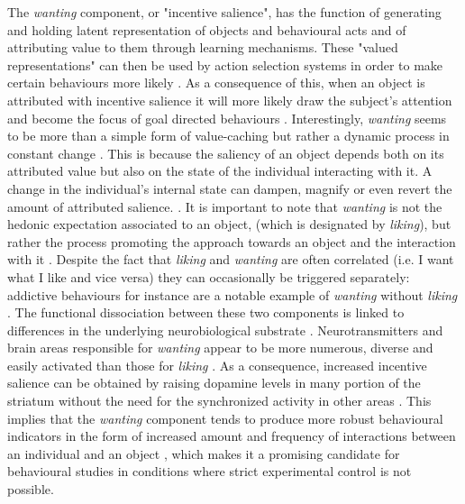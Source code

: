 The \emph{wanting} component, or "incentive salience", has the function of generating and holding latent representation of objects and behavioural acts and of attributing value to them through learning mechanisms. These "valued representations" can then be used by action selection systems in order to make certain behaviours more likely \cite{ikemoto1996dissociations,berridge1998role,mcclure2003computational,berridge2004motivation}. As a consequence of this, when an object is attributed with incentive salience it will more likely draw the subject's attention and become the focus of goal directed behaviours \cite{berridge2004motivation}. Interestingly, \emph{wanting} seems to be more than a simple form of value-caching but rather a dynamic process in constant change \cite{robinson1993neural,zhang2009neural,tindell2009dynamic,berridge2012prediction}. This is because the saliency of an object depends both on its attributed value but also on the state of the individual interacting with it. A change in the individual's internal state can dampen, magnify or even revert the amount of attributed salience. \cite{robinson1993neural,zhang2009neural,tindell2009dynamic,berridge2012prediction}. It is important to note that \emph{wanting} is not the hedonic expectation associated to an object, (which is designated by \emph{liking}), but rather the process promoting the approach towards an object and the interaction with it \cite{berridge2009dissecting,robinson2015roles}. Despite the fact that \emph{liking} and \emph{wanting} are often correlated (i.e. I want what I like and vice versa) they can occasionally be triggered separately: addictive behaviours for instance are a notable example of \emph{wanting} without \emph{liking} \cite{robinson1993neural}. The functional dissociation between these two components is linked to differences in the underlying neurobiological substrate \cite{berridge2009dissecting,smith2011disentangling}. Neurotransmitters and brain areas responsible for \emph{wanting} appear to be more numerous, diverse and easily activated than those for \emph{liking} \cite{berridge2009dissecting,robinson2015roles}. As a consequence, increased incentive salience can be obtained by raising dopamine levels in many portion of the striatum without the need for the synchronized activity in other areas \cite{berridge2009dissecting,smith2011disentangling,meyer2015motivational}. This implies that the \emph{wanting} component tends to produce more robust behavioural indicators in the form of increased amount and frequency of interactions between an individual and an object \cite{berridge1998role}, which makes it a promising candidate for behavioural studies in conditions where strict experimental control is not possible.


